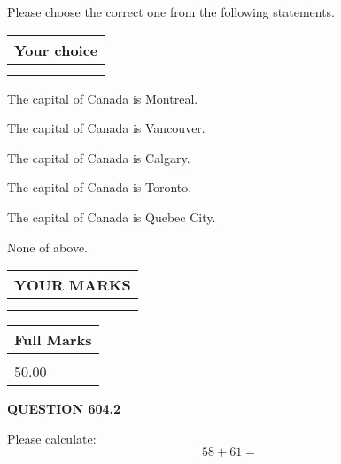 \documentclass[12pt]{article}
\begin{document}
  
Please choose the correct one from the following statements.
  
  
\noindent\hspace{3.0in} \begin{tabular}{|l|}
\hline
Your choice \\
\hline
 \\ 
 \\ 
\hline
\end{tabular}
  
  
 
 
The capital of Canada is Montreal.
 
 
The capital of Canada is Vancouver.
 
 
The capital of Canada is Calgary.
 
 
The capital of Canada is Toronto.
 
 
The capital of Canada is Quebec City.
 
 
 None of above.
 
 
  
\vspace{0.2in}
  
\noindent\begin{tabular}{|l|}
\hline
 YOUR MARKS  \\
\hline
 \\ 
 \\ 
\hline
\end{tabular}
\hspace{0.05in} \begin{tabular}{|l|}
\hline
 Full Marks  \\
\hline
 \\ 
50.00 \\
\hline
\end{tabular}
{\textbf{\Large{QUESTION
604.2 
}}}
  
  
 
Please calculate:
\begin{equation}
58 +  %
61 = \nonumber
\end{equation}
 

 

 
   
   
 \vspace{0.2in}
 
   
   
   
   
\end{document}
